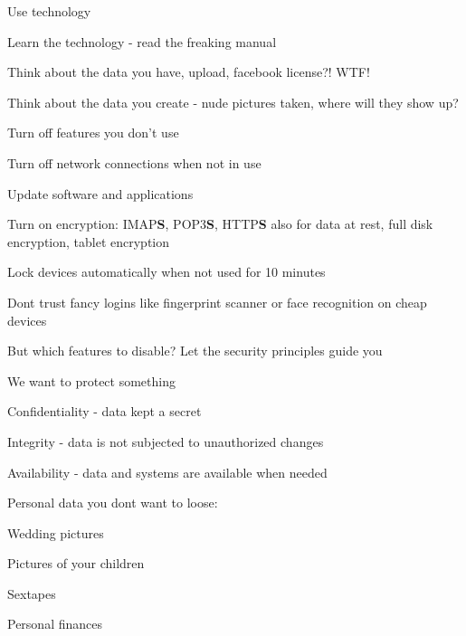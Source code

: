 \documentclass[Screen16to9,17pt]{foils}
\begin{document}
\begin{list1}
\item Use technology
\item Learn the technology - read the freaking manual
\item Think about the data you have, upload, facebook license?! WTF!
\item Think about the data you create - nude pictures taken, where will they show up?
\begin{list2}
\item Turn off features you don't use
\item Turn off network connections when not in use
\item Update software and applications
\item Turn on encryption: IMAP{\bf S}, POP3{\bf S},
  HTTP{\bf S} also for data at rest, full disk encryption, tablet encryption
\item Lock devices automatically when not used for 10 minutes
\item Dont trust fancy logins like fingerprint scanner or face recognition on cheap devices
\end{list2}
\end{list1}

But which features to disable? Let the security principles guide you



\begin{list1}
\item We want to protect something
\item Confidentiality - data kept a secret
\item Integrity - data is not subjected to unauthorized changes
\item Availability - data and systems are available when needed
\end{list1}


\begin{list1}
\item Personal data you dont want to loose:
\begin{list2}
\item Wedding pictures
\item Pictures of your children
\item Sextapes
\item Personal finances
\end{list2}
\end{list1}
\end{document}
